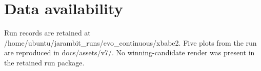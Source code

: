 \section{Data availability}Run records are retained at /home/ubuntu/jarambit\_runs/evo\_continuous/xbabe2. Five plots from the run are reproduced in docs/assets/v7/. No winning-candidate render was present in the retained run package.
